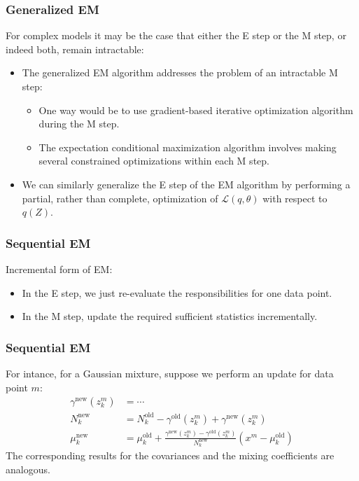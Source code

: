 \documentclass{beamer}
\begin{document}
\begin{frame}
    \frametitle{Generalized EM}
    For complex models it may be the case that either the E step or the M step, or indeed both, remain intractable:
    \begin{itemize}
        \item The generalized EM algorithm addresses the problem of an intractable M step:
        \begin{itemize}
            \item One way would be to use gradient-based iterative optimization algorithm during the M step.
            \item The expectation conditional maximization algorithm involves making several constrained optimizations within each M step.
        \end{itemize}
        \item We can similarly generalize the E step of the EM algorithm by performing a partial, rather than complete, optimization of $\mathcal{L}(q,\theta)$ with respect to $q(Z)$.
    \end{itemize}
\end{frame}

\begin{frame}
    \frametitle{Sequential EM}
    Incremental form of EM:
    \begin{itemize}
        \item In the E step, we just re-evaluate the responsibilities for one data point.
        \item In the M step, update the required sufficient statistics incrementally.
    \end{itemize}
\end{frame}

\begin{frame}
    \frametitle{Sequential EM}
    For intance, for a Gaussian mixture, suppose we perform an update for data point $m$:
    \begin{align*}
        \gamma^{\textrm{new}}(z^{m}_{k})&=\cdots \\
        N^{\textrm{new}}_{k}&=N^{\textrm{old}}_{k}-\gamma^{\textrm{old}}(z^{m}_{k})+\gamma^{\textrm{new}}(z^{m}_{k}) \\
        \mu^{\textrm{new}}_{k}&=\mu^{\textrm{old}}_{k}+\frac{\gamma^{\textrm{new}}(z^{m}_{k})-\gamma^{\textrm{old}}(z^{m}_{k})}{N^{\textrm{new}}_{k}}(x^{m}-\mu^{\textrm{old}}_{k})
    \end{align*}
    The corresponding results for the covariances and the mixing coefficients are analogous.
\end{frame}
\end{document}
